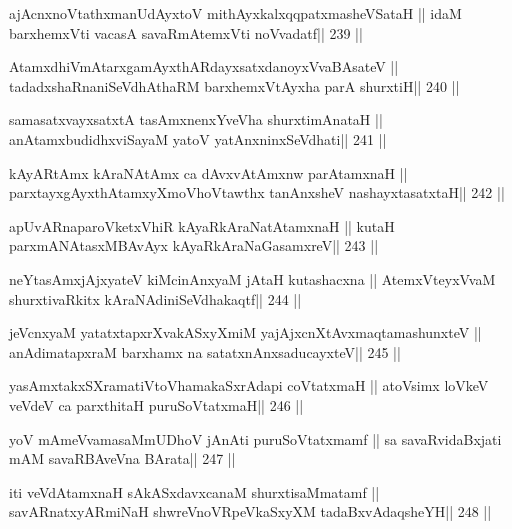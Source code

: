 \begin{shl}
ajAcnxnoVtathxmanUdAyxtoV mithAyxkalxqqpatxmasheVSataH ||
idaM barxhemxVti vacasA savaRmAtemxVti noV\s vadatf\hfill || 239 ||
\end{shl}

\begin{shl}
AtamxdhiVmAtarxgamAyxthARdayxsatxdanoyxV\s vaBAsateV ||
tadadxshaRnaniSeVdhAthaRM barxhemxVtAyxha parA shurxtiH\hfill || 240 ||
\end{shl}

\begin{shl}
samasatxvayxsatxtA tasAmxnenxYveVha shurxtimAnataH ||
anAtamxbudidhxviSayaM yatoV yatAnxninxSeVdhati\hfill || 241 ||
\end{shl}

\begin{shl}
kAyARtAmx kAraNAtAmx ca dAvxvAtAmxnw parAtamxnaH ||
parxtayxgAyxthAtamxyXmoVhoVtawthx tanAnxsheV nashayxtasatxtaH\hfill || 242 ||
\end{shl}

\begin{shl}
apUvARnaparoVketxVhiR kAyaRkAraNatA\s\s tamxnaH ||
kutaH parxmANAtasxMBAvAyx kAyaRkAraNaGasamxreV\hfill || 243 ||
\end{shl}

\begin{shl}
neYtasAmxjAjxyateV kiMcinAnxyaM jAtaH kutashacxna ||
AtemxVteyxVvaM shurxtivaRkitx kAraNAdiniSeVdhakaqtf\hfill || 244 ||
\end{shl}

\begin{shl}
jeVcnxyaM yatatxtapxrXvakASxyXmiM yajAjxcnXtAvx\s maqtamashunxteV ||
anAdimatapxraM barxhamx na satatxnAnxsaducayxteV\hfill || 245 ||
\end{shl}

\begin{shl}
yasAmxtakxSXramatiVtoV\s hamakaSxrAdapi coVtatxmaH ||
atoV\s simx loVkeV veVdeV ca parxthitaH puruSoVtatxmaH\hfill || 246 ||
\end{shl}

\begin{shl}
yoV mAmeVvamasaMmUDhoV jAnAti puruSoVtatxmamf ||
sa savaRvidaBxjati mAM savaRBAveVna BArata\hfill || 247 ||
\end{shl}

\begin{shl}
iti veVdAtamxnaH sAkASxdavxcanaM shurxtisaMmatamf ||
savARnatxyARmiNaH shwreVnoVRpeVkaSxyXM tadaBxvAdaqsheYH\hfill || 248 ||
\end{shl}

